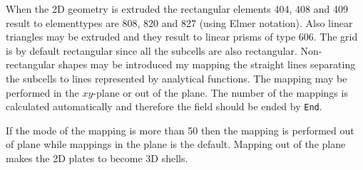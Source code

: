When the 2D geometry is extruded the rectangular elements 404, 408 and 409 result to 
elementtypes are 808, 820 and 827 (using Elmer notation). 
Also linear triangles may be extruded and they result to 
linear prisms of type 606.
%
The grid is by default rectangular since all the subcells are also
rectangular. Non-rectangular shapes may be introduced my mapping
the straight lines separating the subcells to lines represented by 
analytical functions. 
The mapping may be performed in the $xy$-plane or out of the plane.
The number of the mappings is calculated automatically and therefore 
the field should be ended by \texttt{End}.

If the mode of the mapping is more than 50 then 
the mapping is performed out of plane while mappings 
in the plane is the default.
Mapping out of the plane makes the 2D plates to become 3D shells.

